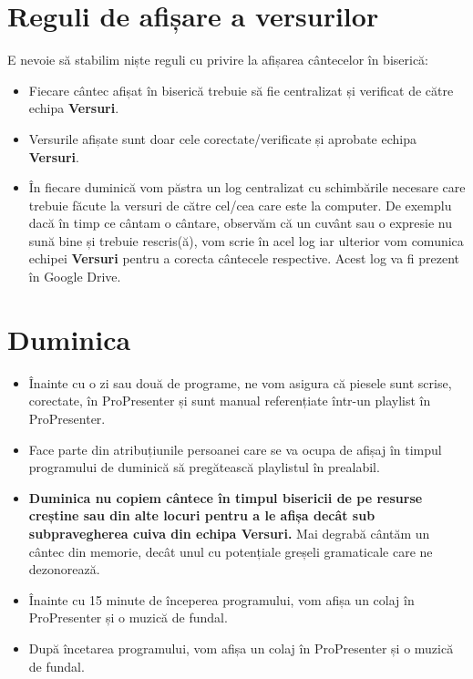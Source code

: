 \documentclass[draft,epjST]{svjour}
\begin{document}
    \section{Reguli de afișare a versurilor}\label{sec:5}
    E nevoie să stabilim niște reguli cu privire la afișarea cântecelor în biserică:
    \begin{itemize}
        \item Fiecare cântec afișat în biserică trebuie să fie centralizat și verificat de către echipa \textbf{Versuri}.
        \item Versurile afișate sunt doar cele corectate/verificate și aprobate echipa \textbf{Versuri}.
        \item În fiecare duminică vom păstra un log centralizat cu schimbările necesare care trebuie făcute la versuri de către cel/cea care este la computer.
        De exemplu dacă în timp ce cântam o cântare, observăm că un cuvânt sau o expresie nu sună bine și trebuie rescris(ă), vom scrie în acel log iar ulterior vom comunica echipei \textbf{Versuri} pentru a corecta cântecele respective.
        Acest log va fi prezent în Google Drive.
    \end{itemize}
%


    \section{Duminica}\label{sec:3}
    \begin{itemize}
        \item Înainte cu o zi sau două de programe, ne vom asigura că piesele sunt scrise, corectate, în ProPresenter și sunt manual referențiate într-un playlist în ProPresenter.
        \item Face parte din atribuțiunile persoanei care se va ocupa de afișaj în timpul programului de duminică să pregătească playlistul în prealabil.
        \item \textbf{Duminica nu copiem cântece în timpul bisericii de pe resurse creștine sau din alte locuri pentru a le afișa decât sub subpravegherea cuiva din echipa \textbf{Versuri}.} Mai degrabă cântăm un cântec din memorie, decât unul cu potențiale greșeli gramaticale care ne dezonorează.
        \item Înainte cu 15 minute de începerea programului, vom afișa un colaj în ProPresenter și o muzică de fundal.
        \item După încetarea programului, vom afișa un colaj în ProPresenter și o muzică de fundal.
    \end{itemize}
%
\end{document}
